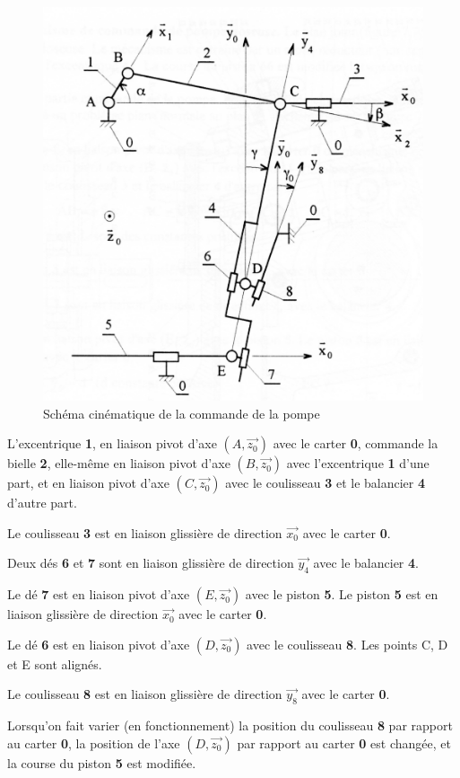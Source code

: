 \begin{figure}[!ht]
\begin{center}
\includegraphics[width=0.6\linewidth]{img/commande_figure_1}
\caption{Schéma cinématique de la commande de la pompe}
\label{commande_figure_1}
\end{center}
\end{figure}

L'excentrique \textbf{1}, en liaison pivot d'axe $(A,\overrightarrow{z_0})$ avec le carter \textbf{0}, commande la bielle \textbf{2}, elle-même en liaison pivot d'axe $(B, \overrightarrow{z_0})$ avec l'excentrique \textbf{1} d'une part, et en liaison pivot d'axe $(C,\overrightarrow{z_0})$ avec le  coulisseau \textbf{3} et le balancier \textbf{4} d'autre part.

Le coulisseau \textbf{3} est en liaison glissière de direction $\overrightarrow{x_0}$ avec le carter \textbf{0}.

Deux dés \textbf{6} et \textbf{7} sont en liaison glissière de direction $\overrightarrow{y_4}$ avec le balancier \textbf{4}.

Le dé \textbf{7} est en liaison pivot d'axe $(E,\overrightarrow{z_0})$ avec le piston \textbf{5}. Le piston \textbf{5} est en liaison glissière de direction $\overrightarrow{x_0}$ avec le carter \textbf{0}.

Le dé \textbf{6} est en liaison pivot d'axe $(D,\overrightarrow{z_0})$ avec le coulisseau \textbf{8}. Les points C, D et E sont alignés.

Le coulisseau \textbf{8} est en liaison glissière de direction $\overrightarrow{y_8}$ avec le carter \textbf{0}.

Lorsqu'on fait varier (en fonctionnement) la position du coulisseau \textbf{8} par rapport au carter \textbf{0}, la position de l'axe $(D,\overrightarrow{z_0})$ par rapport au carter \textbf{0} est changée, et la course du piston \textbf{5} est modifiée.

